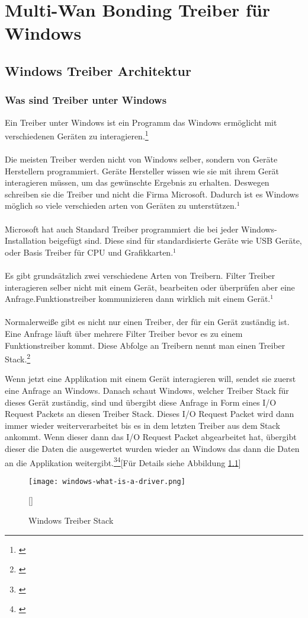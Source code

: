 \chapter{Multi-Wan Bonding Treiber für Windows}
\label{chap:Treiber}

\section{Windows Treiber Architektur}
\subsection{Was sind Treiber unter Windows}
Ein Treiber unter Windows ist ein Programm das Windows ermöglicht mit verschiedenen Geräten zu interagieren.\footnote[1]{\cite[Vgl.][]{21}}
\\\\
Die meisten Treiber werden nicht von Windows selber, sondern von Geräte Herstellern programmiert. Geräte Hersteller wissen wie sie mit ihrem Gerät interagieren müssen, um das gewünschte Ergebnis zu erhalten. Deswegen schreiben sie die Treiber und nicht die Firma Microsoft. Dadurch ist es Windows möglich so viele verschieden arten von Geräten zu unterstützen.$^{1}$
\\\\
Microsoft hat auch Standard Treiber programmiert die bei jeder Windows-Installation beigefügt sind. Diese sind für standardisierte Geräte wie USB Geräte, oder Basis Treiber für CPU und Grafikkarten.$^{1}$
\\\\
Es gibt grundsätzlich zwei verschiedene Arten von Treibern. Filter Treiber interagieren selber nicht mit einem Gerät, bearbeiten oder überprüfen aber eine Anfrage.Funktionstreiber kommunizieren dann wirklich mit einem Gerät.$^{1}$
\\\\
Normalerweiße gibt es nicht nur einen Treiber, der für ein Gerät zuständig ist. Eine Anfrage läuft über mehrere Filter Treiber bevor es zu einem Funktionstreiber kommt. Diese Abfolge an Treibern nennt man einen Treiber Stack.\footnote[2]{\cite[Vgl.][]{19}}

\newpage

Wenn jetzt eine Applikation mit einem Gerät interagieren will, sendet sie zuerst eine Anfrage an Windows. Danach schaut Windows, welcher Treiber Stack für dieses Gerät zuständig, sind und übergibt diese Anfrage in Form eines I/O Request Packets an diesen Treiber Stack. Dieses I/O Request Packet wird dann immer wieder weiterverarbeitet bis es in dem letzten Treiber aus dem Stack ankommt. Wenn dieser dann das I/O Request Packet abgearbeitet hat, übergibt dieser die Daten die ausgewertet wurden wieder an Windows das dann die Daten an die Applikation weitergibt.\footnote[1]{\cite[Vgl.][]{19}}\footnote[2]{\cite[Vgl.][]{20}}[Für Details siehe Abbildung \ref{windows-driver-stack}]
\begin{figure}[H]
    \centering
    \texttt{[image: windows-what-is-a-driver.png]}
    \caption[Windows Treiber Stack]{Windows Treiber Stack}[\cite{20}]
    \label{windows-driver-stack} 
\end{figure}
\noindent
